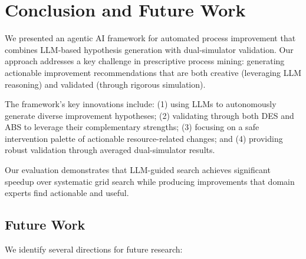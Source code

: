 \documentclass[preprint,12pt]{elsarticle}
\begin{document}
\section{Conclusion and Future Work}
\label{sec:conclusion}

We presented an agentic AI framework for automated process improvement that combines LLM-based hypothesis generation with dual-simulator validation. Our approach addresses a key challenge in prescriptive process mining: generating actionable improvement recommendations that are both creative (leveraging LLM reasoning) and validated (through rigorous simulation).

The framework's key innovations include: (1) using LLMs to autonomously generate diverse improvement hypotheses; (2) validating through both DES and ABS to leverage their complementary strengths; (3) focusing on a safe intervention palette of actionable resource-related changes; and (4) providing robust validation through averaged dual-simulator results.

Our evaluation demonstrates that LLM-guided search achieves significant speedup over systematic grid search while producing improvements that domain experts find actionable and useful.

\subsection{Future Work}

We identify several directions for future research:
\end{document}

